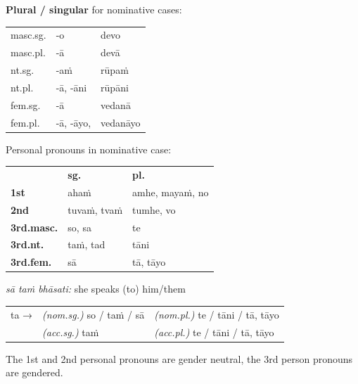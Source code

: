 \documentclass[11pt,oneside]{memoir}
\begin{document}
\begin{multicols}{2}

\textbf{Plural / singular} for nominative cases:

\begin{center}
\begin{tabular}{lll}
masc.sg. & -o & devo\\[0pt]
masc.pl. & -ā & devā\\[0pt]
\hline
nt.sg. & -aṁ & rūpaṁ\\[0pt]
nt.pl. & -ā, -āni & rūpāni\\[0pt]
\hline
fem.sg. & -ā & vedanā\\[0pt]
fem.pl. & -ā, -āyo, & vedanāyo\\[0pt]
\end{tabular}
\end{center}

\columnbreak

Personal pronouns in nominative case:

\begin{center}
\begin{tabular}{lll}
 & \textbf{sg.} & \textbf{pl.}\\[0pt]
\textbf{1st} & ahaṁ & amhe, mayaṁ, no\\[0pt]
\textbf{2nd} & tuvaṁ, tvaṁ & tumhe, vo\\[0pt]
\textbf{3rd.masc.} & so, sa & te\\[0pt]
\textbf{3rd.nt.} & taṁ, tad & tāni\\[0pt]
\textbf{3rd.fem.} & sā & tā, tāyo\\[0pt]
\end{tabular}
\end{center}

\emph{sā taṁ bhāsati:} she speaks (to) him/them

\vspace*{-\baselineskip}

\begin{center}
\begin{tabular}{lll}
ta → & \emph{(nom.sg.)} so / taṁ / sā & \emph{(nom.pl.)} te / tāni / tā, tāyo\\[0pt]
 & \emph{(acc.sg.)} taṁ & \emph{(acc.pl.)}  te / tāni / tā, tāyo\\[0pt]
\end{tabular}
\end{center}

\end{multicols}
\bigskip

The 1st and 2nd personal pronouns are gender neutral, the 3rd person pronouns are gendered.
\end{document}
